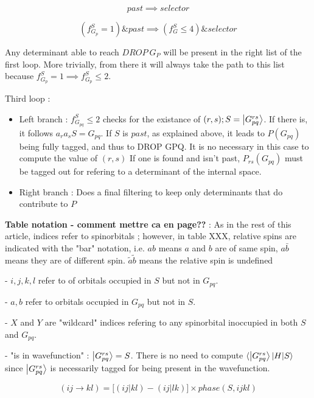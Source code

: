 \documentclass[./thesis.tex]{subfiles}
\begin{document}
\begin{equation}
past \implies selector
\end{equation}


\begin{equation}
(f^S_{G_{p}} = 1) \& past \implies (f^S_G \leq 4) \& selector
\end{equation}



Any determinant able to reach $DROP\ G_P$ will be present in the right list of the first loop. More trivially, from there it will always take the path to this list because $f^S_{G_{p}} = 1 \implies f^S_{G_{p}} \leq 2$.

Third loop :
\begin{itemize}

\item
Left branch : $f_{G_{pq}}^S \leq 2$ checks for the existance of $(r,s) ;S=\ket {G_{pq}^{rs}}$. 
If there is, it follows $a_r a_s S = G_{pq}$. If $S$ is $past$, as explained above, it leads to $P(G_{pq})$ being fully tagged, and thus to DROP GPQ. It is no necessary in this case to compute the value of $(r,s)$
If one is found and isn't past, $P_{rs}(G_{pq})$ must be tagged out for refering to a determinant of the internal space.
\item
Right branch :
Does a final filtering to keep only determinants that do contribute to $P$
\end{itemize}



\textbf{Table notation - comment mettre ca en page??} : As in the rest of this article, indices refer to spinorbitals ; however, in table XXX, relative spins are indicated with the "bar" notation, i.e. $ab$ means $a$ and $b$ are of same spin, $a\bar b$ means they are of different spin. $\tilde a \tilde b$ means the relative spin is undefined

- $i,j,k,l$ refer to of orbitals occupied in $S$ but not in $G_{pq}$.

- $a,b$ refer to orbitals occupied in $G_{pq}$ but not in $S$.

- $X$ and $Y$ are "wildcard" indices refering to any spinorbital inoccupied in both $S$ and $G_{pq}$.

- "is in wavefunction" : $\ket {G_{pq}^{rs}} = S$. There is no need to compute $\langle \ket {G_{pq}^{rs}}|H|S \rangle$ since $\ket {G_{pq}^{rs}}$ is necessarily tagged for being present in the wavefunction.



\begin{equation}
(ij \rightarrow kl) = \big [(ij|kl) - (ij|lk) \big ] \times phase(S,ijkl)
\end{equation}
\end{document}
